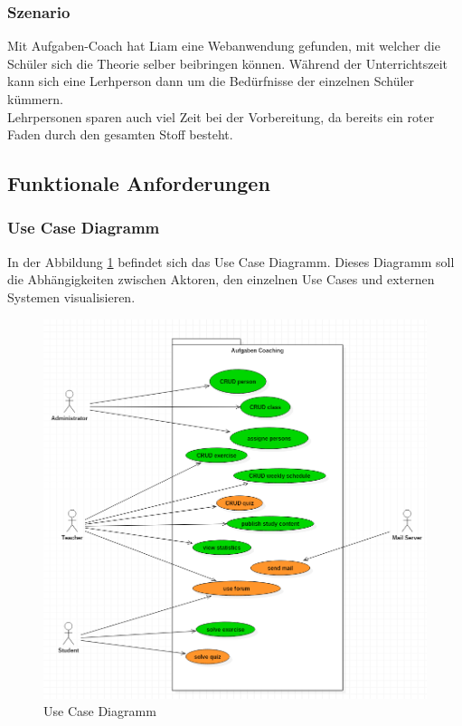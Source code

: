 \subsubsection*{Szenario}
Mit Aufgaben-Coach hat Liam eine Webanwendung gefunden, mit welcher die Schüler sich die Theorie selber beibringen können. Während der Unterrichtszeit kann sich eine Lerhperson dann um die Bedürfnisse der einzelnen Schüler kümmern. \\
Lehrpersonen sparen auch viel Zeit bei der Vorbereitung, da bereits ein roter Faden durch den gesamten Stoff besteht.

\subsection{Funktionale Anforderungen}

\subsubsection{Use Case Diagramm}
In der Abbildung \ref{uc_diagram} befindet sich das Use Case Diagramm. Dieses Diagramm soll die Abhängigkeiten zwischen Aktoren, den einzelnen Use Cases und externen Systemen visualisieren.

\begin{minipage}{\textwidth}

\begin{figure}[H]
	\includegraphics[width=\textwidth, height=\textheight, keepaspectratio]{images/UseCaseDiagramm.png}
	\caption{Use Case Diagramm}
	\label{uc_diagram}
\end{figure}

\end{minipage}


